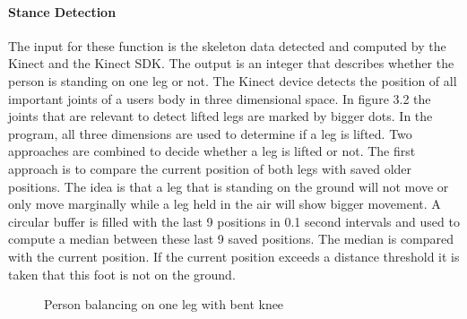 \paragraph{Stance Detection}
The input for these function is the skeleton data detected and computed by the Kinect and the Kinect SDK. The output is an integer that describes whether the person is standing on one leg or not.
The Kinect device detects the position of all important joints of a users body in three dimensional space. In figure 3.2 the joints that are relevant to detect lifted legs are marked by bigger dots. In the program, all three dimensions are used to determine if a leg is lifted. Two approaches are combined to decide whether a leg is lifted or not. The first approach is to compare the current position of both legs with saved older positions. The idea is that a leg that is standing on the ground will not move or only move marginally while a leg held in the air will show bigger movement. A circular buffer is filled with the last 9 positions in 0.1 second intervals and used to compute a median between these last 9 saved positions. The median is compared with the current position. If the current position exceeds a distance threshold it is taken that this foot is not on the ground.
\begin{figure}
	\centering
	\caption{Person balancing on one leg with bent knee}
	\label{fig:3-IMR:rehabilitationstance}
\end{figure}
